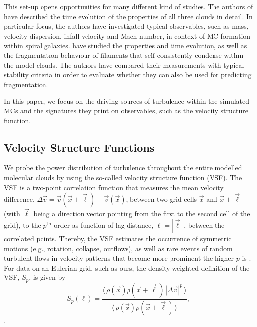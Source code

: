 This set-up opens opportunities for many different kind of studies. 
The authors of  have described the time evolution of the properties of all three clouds in detail.
In particular focus, the authors have investigated typical observables, such as mass, velocity dispersion, infall velocity and Mach number, in context of MC formation within spiral galaxies.
 have studied the properties and time evolution, as well as the fragmentation behaviour of filaments that self-consistently condense within the model clouds. 
The authors have compared their measurements with typical stability criteria in order to evaluate whether they can also be used for predicting fragmentation.

In this paper, we focus on the driving sources of turbulence within the simulated MCs and the signatures they print on observables, such as the velocity structure function.


\subsection{Velocity Structure Functions}\label{methods:vsf}


We probe the power distribution of turbulence throughout the entire modelled molecular clouds by using the so-called velocity structure function (VSF).
The VSF is a two-point correlation function that measures the mean velocity difference, $\Delta \vec{v} = \vec{v}(\vec{x}+\vec{\ell}) - \vec{v}(\vec{x})$, between two grid cells $\vec{x}$ and $\vec{x}+\vec{\ell}$ (with $\vec{\ell}$ being a direction vector pointing from the first to the second cell of the grid), to the $p^\mathrm{th}$ order as function of lag distance, $\ell = |\vec{\ell}|$, between the correlated points.
Thereby, the VSF estimates the occurrence of symmetric motions (e.g., rotation, collapse, outflows), as well as rare events of random turbulent flows in velocity patterns that become more prominent the higher $p$ is \citep{Heyer2004}.
For data on an Eulerian grid, such as ours, the density weighted definition of the VSF, $\mathit{S}_p$, is given by
\begin{equation}
	\mathit{S}_p (\ell) = \frac{\langle \, \rho(\vec{x}) \rho(\vec{x}+\vec{\ell}) \, |\Delta \vec{v}|^p  \, \rangle}{\langle  \, \rho(\vec{x}) \rho(\vec{x}+\vec{\ell}) \, \rangle} ,
    \label{equ:method:def_vsf}
\end{equation}
\citep[and references within]{Padoan2016a}.

